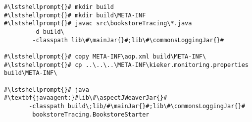 \begin{lstlisting}[caption=Commands to compile and run the annotated Bookstore under Windows, label=lst:traceAnalysisCompileRunExample1Win]
#\lstshellprompt{}# mkdir build
#\lstshellprompt{}# mkdir build\META-INF
#\lstshellprompt{}# javac src\bookstoreTracing\*.java
        -d build\
        -classpath lib\#\mainJar{}#;lib\#\commonsLoggingJar{}#

#\lstshellprompt{}# copy META-INF\aop.xml build\META-INF\
#\lstshellprompt{}# cp ..\..\..\META-INF\kieker.monitoring.properties build\META-INF\

#\lstshellprompt{}# java -#\textbf{javaagent:}#lib\#\aspectJWeaverJar{}# 
       -classpath build\;lib/#\mainJar{}#;lib\#\commonsLoggingJar{}# 
        bookstoreTracing.BookstoreStarter
\end{lstlisting}
